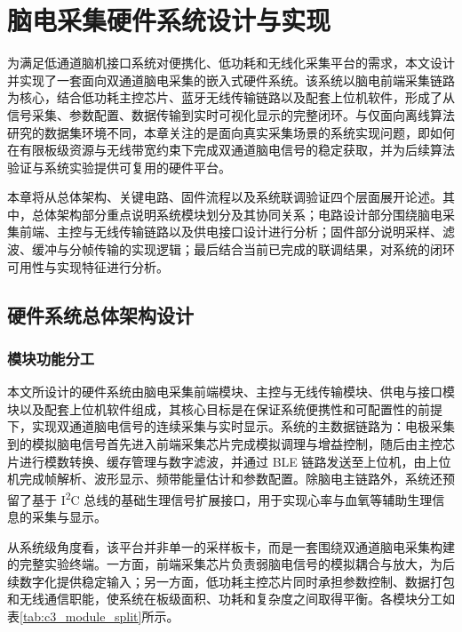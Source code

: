 \chapter{脑电采集硬件系统设计与实现}
\label{cha:hardware}

为满足低通道脑机接口系统对便携化、低功耗和无线化采集平台的需求，本文设计并实现了一套面向双通道脑电采集的嵌入式硬件系统。该系统以脑电前端采集链路为核心，结合低功耗主控芯片、蓝牙无线传输链路以及配套上位机软件，形成了从信号采集、参数配置、数据传输到实时可视化显示的完整闭环。与仅面向离线算法研究的数据集环境不同，本章关注的是面向真实采集场景的系统实现问题，即如何在有限板级资源与无线带宽约束下完成双通道脑电信号的稳定获取，并为后续算法验证与系统实验提供可复用的硬件平台。

本章将从总体架构、关键电路、固件流程以及系统联调验证四个层面展开论述。其中，总体架构部分重点说明系统模块划分及其协同关系；电路设计部分围绕脑电采集前端、主控与无线传输链路以及供电接口设计进行分析；固件部分说明采样、滤波、缓冲与分帧传输的实现逻辑；最后结合当前已完成的联调结果，对系统的闭环可用性与实现特征进行分析。

\section{硬件系统总体架构设计}

\subsection{模块功能分工}

本文所设计的硬件系统由脑电采集前端模块、主控与无线传输模块、供电与接口模块以及配套上位机软件组成，其核心目标是在保证系统便携性和可配置性的前提下，实现双通道脑电信号的连续采集与实时显示。系统的主数据链路为：电极采集到的模拟脑电信号首先进入前端采集芯片完成模拟调理与增益控制，随后由主控芯片进行模数转换、缓存管理与数字滤波，并通过 BLE 链路发送至上位机，由上位机完成帧解析、波形显示、频带能量估计和参数配置。除脑电主链路外，系统还预留了基于 I\textsuperscript{2}C 总线的基础生理信号扩展接口，用于实现心率与血氧等辅助生理信息的采集与显示。

从系统级角度看，该平台并非单一的采样板卡，而是一套围绕双通道脑电采集构建的完整实验终端。一方面，前端采集芯片负责弱脑电信号的模拟耦合与放大，为后续数字化提供稳定输入；另一方面，低功耗主控芯片同时承担参数控制、数据打包和无线通信职能，使系统在板级面积、功耗和复杂度之间取得平衡。各模块分工如表\ref{tab:c3_module_split}所示。

